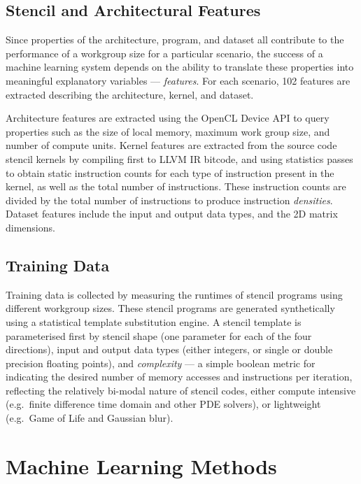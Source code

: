 \documentclass[preprint,nonatbib,10pt]{sigplanconf}
\begin{document}
\subsection{Stencil and Architectural Features}

Since properties of the architecture, program, and dataset all
contribute to the performance of a workgroup size for a particular
scenario, the success of a machine learning system depends on the
ability to translate these properties into meaningful explanatory
variables --- \emph{features}. For each scenario, 102 features are
extracted describing the architecture, kernel, and dataset.

Architecture features are extracted using the OpenCL Device API to
query properties such as the size of local memory, maximum work group
size, and number of compute units. Kernel features are extracted from
the source code stencil kernels by compiling first to LLVM IR bitcode,
and using statistics passes to obtain static instruction counts for
each type of instruction present in the kernel, as well as the total
number of instructions. These instruction counts are divided by the
total number of instructions to produce instruction
\emph{densities}. Dataset features include the input and output data
types, and the 2D matrix dimensions.


\subsection{Training Data}\label{subsec:training}

Training data is collected by measuring the runtimes of stencil
programs using different workgroup sizes. These stencil programs are
generated synthetically using a statistical template substitution
engine. A stencil template is parameterised first by stencil shape
(one parameter for each of the four directions), input and output data
types (either integers, or single or double precision floating
points), and \emph{complexity} --- a simple boolean metric for
indicating the desired number of memory accesses and instructions per
iteration, reflecting the relatively bi-modal nature of stencil codes,
either compute intensive (e.g.\ finite difference time domain and
other PDE solvers), or lightweight (e.g.\ Game of Life and Gaussian
blur).


\section{Machine Learning Methods}\label{sec:ml}
\end{document}
